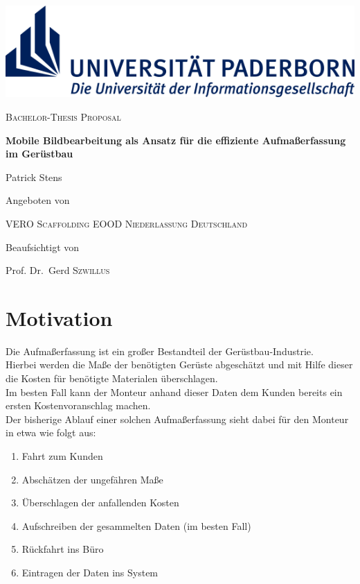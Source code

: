 \documentclass[a4paper]{article}
\newcommand{\Vero}{\textsc{VERO Scaffolding EOOD Niederlassung Deutschland}}
\begin{document}
\renewcommand{\refname}{Literatur}

\begin{titlepage}
	\centering
	\includegraphics[width=\textwidth]{logo}
	\par\vspace{5cm}

	{\scshape\Large Bachelor-Thesis Proposal\par}
	\vspace{1cm}

	{\huge\bfseries Mobile Bildbearbeitung als Ansatz für die effiziente Aufmaßerfassung im Gerüstbau\par}
	\vspace{2cm}

	{\large \par}

	{\Large Patrick Stens\par}

	\vfill

	Angeboten von\par
	\Vero

	\vfill

	Beaufsichtigt von\par
	Prof. Dr.~Gerd \textsc{Szwillus}	

\end{titlepage}

\section*{Motivation}
Die Aufmaßerfassung ist ein großer Bestandteil der Gerüstbau-Industrie. \\
Hierbei werden die Maße der benötigten Gerüste abgeschätzt und mit Hilfe dieser die Kosten für benötigte Materialen überschlagen. \\
Im besten Fall kann der Monteur anhand dieser Daten dem Kunden bereits ein ersten Kostenvoranschlag machen. \\
Der bisherige Ablauf einer solchen Aufmaßerfassung sieht dabei für den Monteur in etwa wie folgt aus:
\begin{enumerate}
	\item Fahrt zum Kunden
	\item Abschätzen der ungefähren Maße
	\item Überschlagen der anfallenden Kosten
	\item Aufschreiben der gesammelten Daten (im besten Fall)
	\item Rückfahrt ins Büro
	\item Eintragen der Daten ins System
\end{enumerate}
\end{document}

